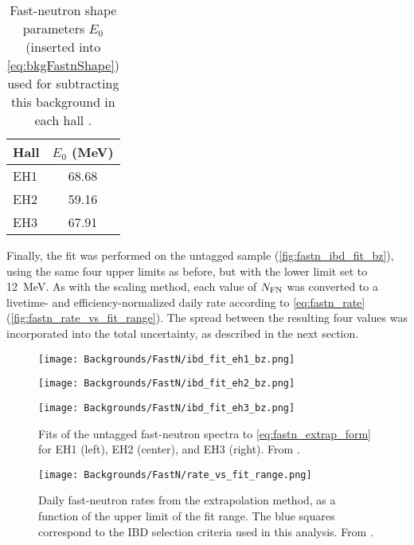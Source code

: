 \documentclass[../thesis.tex]{subfiles}
\begin{document}
\begin{table}[ht]
  \begin{tabular}{lc}
    \toprule
    Hall & $E_0$ (MeV) \\
    \midrule
    EH1 & 68.68 \\
    EH2 & 59.16 \\
    EH3 & 67.91 \\
    \bottomrule
  \end{tabular}
  \caption{Fast-neutron shape parameters $E_0$ (inserted into \autoref{eq:bkgFastnShape}) used for subtracting this background in each hall \cite{fastn}.}
    \label{tab:fastnShapePars}
\end{table}

Finally, the fit was performed on the untagged sample (\autoref{fig:fastn_ibd_fit_bz}), using the same four upper limits as before, but with the lower limit set to 12~MeV.  As with the scaling method, each value of $N_\mathrm{FN}$ was converted to a livetime- and efficiency-normalized daily rate according to \autoref{eq:fastn_rate} (\autoref{fig:fastn_rate_vs_fit_range}). The spread between the resulting four values was incorporated into the total uncertainty, as described in the next section.

\begin{figure}[ht]
  \begin{minipage}{0.333\textwidth}%
    \texttt{[image: Backgrounds/FastN/ibd\_fit\_eh1\_bz.png]}%
  \end{minipage}%
  \begin{minipage}{0.333\textwidth}%
    \texttt{[image: Backgrounds/FastN/ibd\_fit\_eh2\_bz.png]}%
  \end{minipage}%
  \begin{minipage}{0.333\textwidth}%
    \texttt{[image: Backgrounds/FastN/ibd\_fit\_eh3\_bz.png]}%
  \end{minipage}%
  \caption{Fits of the untagged fast-neutron spectra to \autoref{eq:fastn_extrap_form} for EH1 (left), EH2 (center), and EH3 (right). From \cite{fastn}.}
  \label{fig:fastn_ibd_fit_bz}
\end{figure}

\begin{figure}[h]
  \texttt{[image: Backgrounds/FastN/rate\_vs\_fit\_range.png]}
  \caption{Daily fast-neutron rates from the extrapolation method, as a function of the upper limit of the fit range. The blue squares correspond to the IBD selection criteria used in this analysis. From \cite{fastn}.}
  \label{fig:fastn_rate_vs_fit_range}
\end{figure}
\end{document}
